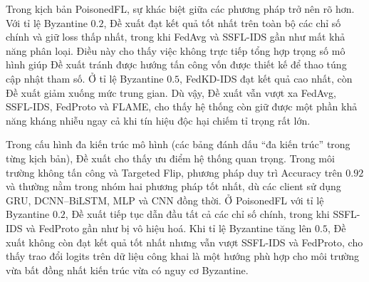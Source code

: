 Trong kịch bản PoisonedFL, sự khác biệt giữa các phương pháp trở nên rõ hơn. Với tỉ lệ Byzantine $0.2$, Đề xuất đạt kết quả tốt nhất trên toàn bộ các chỉ số chính và giữ loss thấp nhất, trong khi FedAvg và SSFL-IDS gần như mất khả năng phân loại. Điều này cho thấy việc không trực tiếp tổng hợp trọng số mô hình giúp Đề xuất tránh được hướng tấn công vốn được thiết kế để thao túng cập nhật tham số. Ở tỉ lệ Byzantine $0.5$, FedKD-IDS đạt kết quả cao nhất, còn Đề xuất giảm xuống mức trung gian. Dù vậy, Đề xuất vẫn vượt xa FedAvg, SSFL-IDS, FedProto và FLAME, cho thấy hệ thống còn giữ được một phần khả năng kháng nhiễu ngay cả khi tín hiệu độc hại chiếm tỉ trọng rất lớn.

Trong cấu hình đa kiến trúc mô hình (các bảng đánh dấu ``đa kiến trúc'' trong từng kịch bản), Đề xuất cho thấy ưu điểm hệ thống quan trọng. Trong môi trường không tấn công và Targeted Flip, phương pháp duy trì Accuracy trên $0.92$ và thường nằm trong nhóm hai phương pháp tốt nhất, dù các client sử dụng GRU, DCNN--BiLSTM, MLP và CNN đồng thời. Ở PoisonedFL với tỉ lệ Byzantine $0.2$, Đề xuất tiếp tục dẫn đầu tất cả các chỉ số chính, trong khi SSFL-IDS và FedProto gần như bị vô hiệu hoá. Khi tỉ lệ Byzantine tăng lên $0.5$, Đề xuất không còn đạt kết quả tốt nhất nhưng vẫn vượt SSFL-IDS và FedProto, cho thấy trao đổi logits trên dữ liệu công khai là một hướng phù hợp cho môi trường vừa bất đồng nhất kiến trúc vừa có nguy cơ Byzantine.


